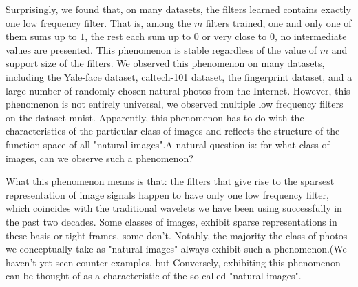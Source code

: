 \documentclass[a4paper]{article}
\begin{document}
Surprisingly, we found that, on many datasets, the filters learned contains exactly one low frequency filter. That is, among the $m$ filters trained, one and only one of them sums up to $1$, the rest each sum up to $0$ or very close to $0$, no intermediate values are presented. This phenomenon is stable regardless of the value of $m$ and support size of the filters. We observed this phenomenon on many datasets, including the Yale-face dataset, caltech-101 dataset, the fingerprint dataset, and a large number of randomly chosen natural photos from the Internet. However, this phenomenon is not entirely universal, we observed multiple low frequency filters on the dataset mnist. Apparently, this phenomenon has to do with the characteristics of the particular class of images and reflects the structure of the function space of all "natural images".A natural question is: for what class of images, can we observe such a phenomenon?

What this phenomenon means is that: the filters that give rise to the sparsest representation of image signals happen to have only one low frequency filter, which coincides with the traditional wavelets we have been using successfully in the past two decades. Some classes of images, exhibit sparse representations in these basis or tight frames, some don't. Notably, the majority the class of photos we conceptually take as "natural images" always exhibit such a phenomenon.(We haven't yet seen counter examples, but  Conversely, exhibiting this phenomenon can be thought of as a characteristic of the so called "natural images". 
\end{document}
